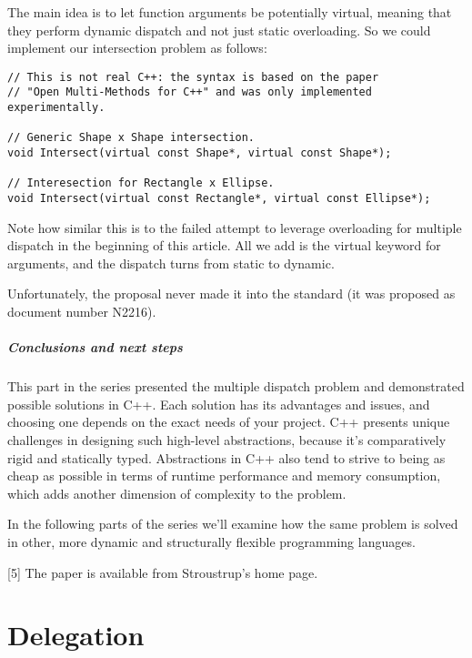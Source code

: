 \documentclass{book}
\begin{document}
The main idea is to let function arguments be potentially virtual, meaning that they perform dynamic dispatch and not just static overloading.
So we could implement our intersection problem as follows:
\begin{lstlisting}
// This is not real C++: the syntax is based on the paper
// "Open Multi-Methods for C++" and was only implemented experimentally.

// Generic Shape x Shape intersection.
void Intersect(virtual const Shape*, virtual const Shape*);

// Interesection for Rectangle x Ellipse.
void Intersect(virtual const Rectangle*, virtual const Ellipse*);
\end{lstlisting}
Note how similar this is to the failed attempt to leverage overloading for multiple dispatch in the beginning of this article.
All we add is the virtual keyword for arguments, and the dispatch turns from static to dynamic.

Unfortunately, the proposal never made it into the standard (it was proposed as document number N2216).
\paragraph{Conclusions and next steps}

This part in the series presented the multiple dispatch problem and demonstrated possible solutions in C++.
Each solution has its advantages and issues, and choosing one depends on the exact needs of your project.
C++ presents unique challenges in designing such high-level abstractions, because it's comparatively rigid and statically typed.
Abstractions in C++ also tend to strive to being as cheap as possible in terms of runtime performance and memory consumption, which adds another dimension of complexity to the problem.

In the following parts of the series we'll examine how the same problem is solved in other, more dynamic and structurally flexible programming languages.

[5]	The paper is available from Stroustrup's home page.
\chapter{Delegation}
\end{document}
